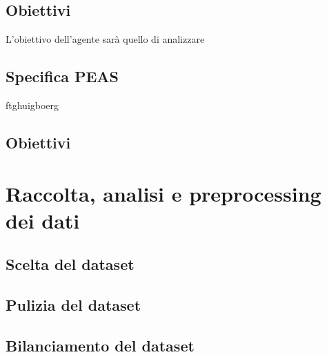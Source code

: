 \documentclass{article} %
\begin{document}
    \subsection{Obiettivi}
    L'obiettivo dell'agente sarà quello di analizzare
    \subsection{Specifica PEAS}
    ftghuigboerg
    \subsection{Obiettivi}
    \section{Raccolta, analisi e preprocessing dei dati}
    \subsection{Scelta del dataset}
    \subsection{Pulizia del dataset}
    \subsection{Bilanciamento del dataset}
\end{document}
